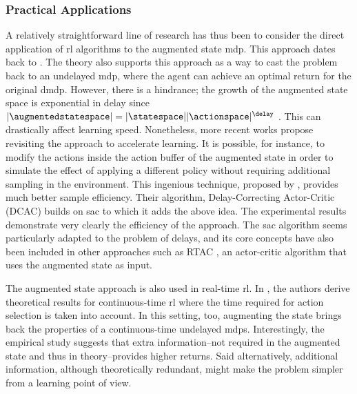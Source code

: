 \subsubsection{Practical Applications}
A relatively straightforward line of research has thus been to consider the direct application of \gls{rl} algorithms to the augmented state \gls{mdp}.
This approach dates back to \cite{brooks1972markov}.
The theory also supports this approach as a way to cast the problem back to an undelayed \gls{mdp}, where the agent can achieve an optimal return for the original \gls{dmdp}. 
However, there is a hindrance; the growth of the augmented state space is exponential in delay since $\lvert\augmentedstatespace\rvert= \lvert\statespace\rvert\lvert\actionspace\rvert^\delay$ \cite{walsh2009learning}. 
This can drastically affect learning speed. 
Nonetheless, more recent works propose revisiting the approach to accelerate learning. 
It is possible, for instance, to modify the actions inside the action buffer of the augmented state in order to simulate the effect of applying a different policy without requiring additional sampling in the environment. 
This ingenious technique, proposed by \cite{bouteiller2020reinforcement}, provides much better sample efficiency. 
Their algorithm, Delay-Correcting Actor-Critic (DCAC) builds on \gls{sac} \cite{haarnoja2018soft}  to which it adds the above idea. 
The experimental results demonstrate very clearly the efficiency of the approach.
The \gls{sac} algorithm seems particularly adapted to the problem of delays, and its core concepts have also been included in other approaches such as RTAC \cite{ramstedt2019real}, an actor-critic algorithm that uses the augmented state as input. 

The augmented state approach is also used in real-time \gls{rl}.
In \cite{xiao2020thinking}, the authors derive theoretical results for continuous-time \gls{rl} where the time required for action selection is taken into account. 
In this setting, too, augmenting the state brings back the properties of a continuous-time undelayed \glspl{mdp}.
Interestingly, the empirical study suggests that extra information--not required in the augmented state and thus in theory--provides higher returns.
Said alternatively, additional information, although theoretically redundant, might make the problem simpler from a learning point of view. 



